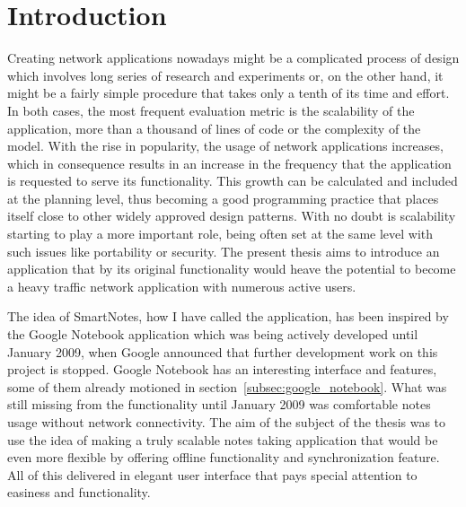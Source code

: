 \chapter{Introduction}
\label{sec:Introduction}
Creating network applications nowadays might be a complicated process of design which involves long series of research and experiments or, on the other hand, it might be a fairly simple procedure that takes only a tenth of its time and effort. In both cases, the most frequent evaluation metric is the scalability of the application, more than a thousand of lines of code or the complexity of the model. With the rise in popularity, the usage of network applications increases, which in consequence results in an increase in the frequency that the application is requested to serve its functionality. This growth can be calculated and included at the planning level, thus becoming a good programming practice that places itself close to other widely approved design patterns. With no doubt is scalability starting to play a more important role, being often set at the same level with such issues like portability or security\cite{scalable_delft}. The present thesis aims to introduce an application that by its original functionality would heave the potential to become a heavy traffic network application with numerous active users. 

The idea of SmartNotes, how I have called the application, has been inspired by the Google Notebook application which was being actively developed until January 2009, when Google announced that further development work on this project is stopped. Google Notebook has an interesting interface and features, some of them already motioned in section~\ref{subsec:google_notebook}. What was still missing from the functionality until January 2009 was comfortable notes usage without network connectivity. The aim of the subject of the thesis was to use the idea of making a truly scalable notes taking application that would be even more flexible by offering offline functionality and synchronization feature. All of this delivered in elegant user interface that pays special attention to easiness and functionality.

